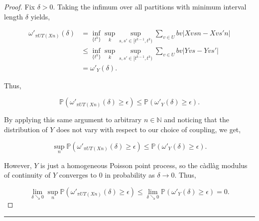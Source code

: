 \documentclass[12pt]{article}
\newcommand{\mb}{\mathbb}
\newcommand{\ra}{\rightarrow}
\newcommand{\ep}{\epsilon}
\newcommand{\lin}{\rule{\linewidth}{0.4 pt}}
\newcommand{\pr}{\mb{P}}							%
\renewcommand{\v}{v}							%
\renewcommand{\U}{U}							%
\renewcommand{\b}{b}							%
\newcommand{\T}{T}								%
\renewcommand{\t}{t}							%
\newcommand{\proj}{\pi}							%
\renewcommand{\tt}{s}							%
\newcommand{\ttt}{s'}							%
\newcommand{\X}{X}								%
\newcommand{\sln}[1]{^{#1}}						%
\newcommand{\XX}{Y}								%
\renewcommand{\it}{k}							%
\begin{document}
\begin{proof}
Fix \(\delta > 0\). Taking the infimum over all partitions with minimum interval length \(\delta\) yields,

\begin{align*}
\omega'_{\proj{\U}{\T}\left(\X{}{}{n}\right)}(\delta) &= \inf_{\{\t\sln{\it}\}}\sup_\it\sup_{\tt,\ttt \in [\t\sln{\it-1},\t\sln{\it})} \sum_{\v\in \U} \b{\v}|\X{\v}{\tt}{n} - \X{\v}{\ttt}{n}|\\
&\leq \inf_{\{\t\sln{\it}\}}\sup_\it\sup_{\tt,\ttt \in [\t\sln{\it-1},\t\sln{\it})} \sum_{\v\in \U} \b{\v}|\XX{\v}{\tt} - \XX{\v}{\ttt}|\\
&= \omega'_{\XX{}{}}(\delta).
\end{align*}

Thus,

\[\pr\left(\omega'_{\proj{\U}{\T}\left(\X{}{}{n}\right)}(\delta) \geq \ep\right) \leq \pr\left(\omega'_{\XX{}{}}(\delta) \geq \ep\right).\]

By applying this same argument to arbitrary \(n\in \mb{N}\) and noticing that the distribution of \(\XX{}{}\) does not vary with respect to our choice of coupling, we get,

\[\sup_{n}\pr\left(\omega'_{\proj{\U}{\T}\left(\X{}{}{n}\right)}(\delta)\geq \ep\right) \leq \pr\left(\omega'_{\XX{}{}}(\delta) \geq \ep\right).\]

However, \(\XX{}{}\) is just a homogeneous Poisson point process, so the c\`adl\`ag modulus of continuity of \(\XX{}{}\) converges to 0 in probability as \(\delta \ra 0\). Thus,

\[\lim_{\delta \searrow 0}\sup_{n}\pr\left(\omega'_{\proj{\U}{\T}\left(\X{}{}{n}\right)}(\delta) \geq \ep\right) \leq \lim_{\delta\searrow 0}\pr\left(\omega'_{\XX{}{}}(\delta)\geq \ep\right) = 0.\]


\end{proof}

\lin
\end{document}
